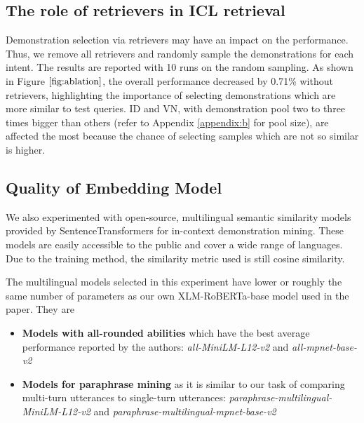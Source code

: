 \subsection{The role of retrievers in ICL retrieval}
Demonstration selection via retrievers may have an impact on the performance. Thus, we remove all retrievers and randomly sample the demonstrations for each intent. The results are reported with 10 runs on the random sampling. As shown in Figure $\ref{fig:ablation}$, the overall performance decreased by 0.71\% without retrievers, highlighting the importance of selecting demonstrations which are more similar to test queries. ID and VN, with demonstration pool two to three times bigger than others (refer to Appendix \ref{appendix:b} for pool size), are affected the most because the chance of selecting samples which are not so similar is higher. 


\subsection{Quality of Embedding Model}
We also experimented with open-source, multilingual semantic similarity models provided by SentenceTransformers \cite{reimers-2019-sentence-bert} for in-context demonstration mining. These models are easily accessible to the public and cover a wide range of languages. Due to the training method, the similarity metric used is still cosine similarity.

The multilingual models selected in this experiment have lower or roughly the same number of parameters as our own XLM-RoBERTa-base model used in the paper. They are
\begin{itemize}
   \item \textbf{Models with all-rounded abilities} which have the best average performance reported by the authors: \textit{all-MiniLM-L12-v2} and \textit{all-mpnet-base-v2}
   \item \textbf{Models for paraphrase mining} as it is similar to our task of comparing multi-turn utterances to single-turn utterances: \textit{paraphrase-multilingual-MiniLM-L12-v2} and \textit{paraphrase-multilingual-mpnet-base-v2}
\end{itemize}

